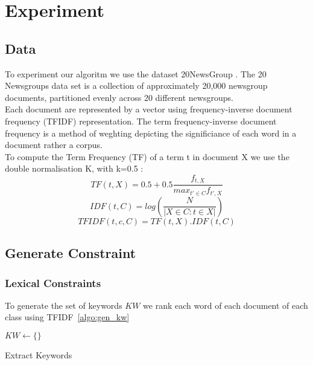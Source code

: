 \section{Experiment}

\subsection{Data}
To experiment our algoritm we use the dataset 20NewsGroup \cite{Newsgroups20}.
The 20 Newsgroups data set is a collection of approximately 20,000 newsgroup 
documents, partitioned evenly across 20 different newsgroups.\\
Each document are represented by a vector using frequency-inverse document 
frequency (TFIDF) representation.
The term frequency-inverse document frequency is a method of weghting depicting 
the significiance of each word in a document rather a corpus.
\\To compute the Term 
Frequency (TF) of a term t in document X we use the double normalisation K, 
with k=0.5 :
\begin{equation}
TF(t, X) = 0.5 + 0.5\frac{f_{t, X}}{max_{t' \in C}f_{t', X}} 
\end{equation}
\begin{equation}
IDF(t, C) = log(\frac{N}{|X \in C : t \in X|})
\end{equation}
\begin{equation}
TFIDF(t,c,C) = TF(t, X) . IDF(t, C)   
\end{equation}
\subsection{Generate Constraint}
\subsubsection{Lexical Constraints}
To generate the set of keywords $KW$ we rank each word of each 
document of each class using TFIDF~\ref{algo:gen_kw}
\begin{algorithm}
  $KW \gets \{\}$\\
  \caption{\label{algo:gen_kw}Extract Keywords}
\end{algorithm}
